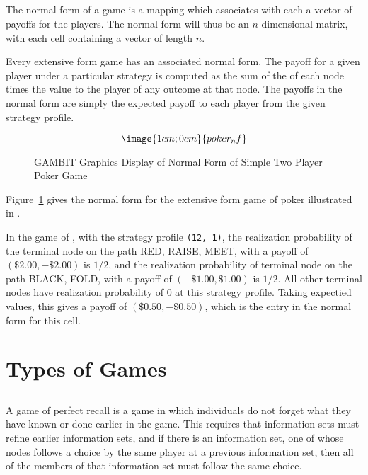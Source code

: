\subsection{}\label{normformsec}
The normal form of a game is a mapping which associates with 
each  a vector of
 payoffs for the players.  The normal form will thus be an $n$ dimensional 
matrix, with each cell containing a vector of length $n$.

Every extensive form game has an associated normal form.  The payoff for 
a given player under a particular strategy is computed as the sum of the 
 of each node times the 
value to the player of any outcome at that node.  The payoffs in the normal 
form are simply the expected payoff to each player from the given strategy
 profile.  

\begin{figure}
$$\image{1cm;0cm}{poker_nf}$$
\caption{GAMBIT Graphics Display of Normal Form of
		Simple Two Player Poker Game}\label{fig:samp2}
\end{figure}

Figure~\ref{fig:samp2} gives the normal form for the extensive form game 
of poker illustrated in 
. 

In the game of  , with the 
strategy profile {\tt (12, 1)}, the realization probability of the terminal 
node on the path RED, RAISE, MEET, with a payoff of $(\$2.00, -\$2.00)$ 
is $1/2$, and the realization probability of terminal node on the path 
BLACK, FOLD, with a payoff of  $(-\$1.00, \$1.00)$ is $1/2$.    All other 
terminal nodes have realization probability of $0$ at this strategy profile.  
Taking expectied values, this gives a payoff of  
$(\$0.50, -\$0.50)$, which is the entry in the normal form for this cell.  

\section{Types of Games}
\subsection{}\label{perfrecallsec}
A game of perfect recall is a game in which individuals do not forget what
they have known or done earlier in the game.  This requires that
information sets must refine earlier information sets, and if there is
an information set, one of whose nodes follows a choice by the same player
at a previous information set, then all of the members of that information
set must follow the same choice.

